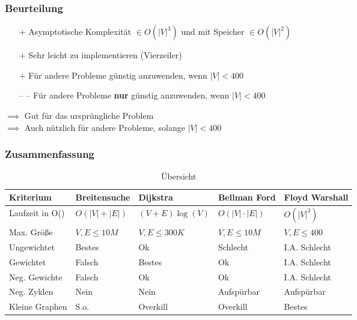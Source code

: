 \begin{frame}
\frametitle{Beurteilung}
\begin{itemize}

\item[+] Asymptotische Komplexität $\in O(|V|^3)$  und mit Speicher $\in O(|V|^2)$
\item[+] Sehr leicht zu implementieren (Vierzeiler)
\item[+] Für andere Probleme günstig anzuwenden, wenn $|V|< 400$
\item[-- --] Für andere Probleme \textbf{nur} günstig anzuwenden, wenn $|V|< 400$
\end{itemize}

$\implies$ Gut für das ursprüngliche Problem\\
$\implies$ Auch nützlich für andere Probleme, solange $|V| < 400$
\end{frame}


\begin{frame}
\frametitle{Zusammenfassung}
\footnotesize{\begin{table}
\begin{tabular}{l l l l l}
\toprule
\textbf{Kriterium} & \textbf{Breitensuche} & \textbf{Dijkstra} & \textbf{Bellman Ford} &\textbf{Floyd Warshall}\\
\midrule
Laufzeit in O() & $O(|V| + |E|)$ & $(V+E)\log(V)$ & $O(|V| \cdot |E|)$ & $O(|V|^3)$ \\
Max. Größe & $V,E \leq 10M$  & $V,E \leq 300K$ & $V,E \leq 10M$ & $V,E \leq 400$ \\
Ungewichtet & Bestes & Ok & Schlecht & I.A. Schlecht \\
Gewichtet & Falsch & Bestes & Ok & I.A. Schlecht \\
Neg. Gewichte & Falsch & Ok & Ok & I.A. Schlecht \\
Neg. Zyklen & Nein & Nein & Aufspürbar & Aufspürbar \\
Kleine Graphen & S.o. & Overkill & Overkill & Bestes \\
\bottomrule
\end{tabular}
\caption{Übersicht}
\end{table}}
\end{frame}

